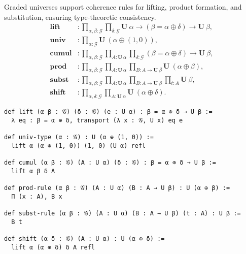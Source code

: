 \documentclass{article}
\begin{document}
\begin{definition}
Graded universes support coherence rules for lifting, product formation, and substitution,
ensuring type-theoretic consistency.
\[
\begin{aligned}
\mathbf{lift} & : \prod_{\alpha, \beta : \mathcal{G}} \prod_{\delta : \mathcal{G}}
\mathbf{U}\ \alpha \to (\beta = \alpha \oplus \delta) \to \mathbf{U}\ \beta, \\
\mathbf{univ} & : \prod_{\alpha : \mathcal{G}} \mathbf{U}\ (\alpha \oplus (1, 0)), \\
\mathbf{cumul} & : \prod_{\alpha, \beta : \mathcal{G}} \prod_{A : \mathbf{U}\ \alpha}
\prod_{\delta : \mathcal{G}} (\beta = \alpha \oplus \delta) \to \mathbf{U}\ \beta, \\
\mathbf{prod} & : \prod_{\alpha, \beta : \mathcal{G}} \prod_{A : \mathbf{U}\ \alpha}
\prod_{B : A \to \mathbf{U}\ \beta} \mathbf{U}\ (\alpha \oplus \beta), \\
\mathbf{subst} & : \prod_{\alpha, \beta : \mathcal{G}} \prod_{A : \mathbf{U}\ \alpha}
\prod_{B : A \to \mathbf{U}\ \beta} \prod_{t : A} \mathbf{U}\ \beta, \\
\mathbf{shift} & : \prod_{\alpha, \delta : \mathcal{G}} \prod_{A : \mathbf{U}\ \alpha}
\mathbf{U}\ (\alpha \oplus \delta).
\end{aligned}
\]
\begin{lstlisting}[mathescape=true]
def lift (α β : 𝒢) (δ : 𝒢) (e : U α) : β = α ⊕ δ → U β :=
  λ eq : β = α ⊕ δ, transport (λ x : 𝒢, U x) eq e

def univ-type (α : 𝒢) : U (α ⊕ (1, 0)) :=
  lift α (α ⊕ (1, 0)) (1, 0) (U α) refl

def cumul (α β : 𝒢) (A : U α) (δ : 𝒢) : β = α ⊕ δ → U β :=
  lift α β δ A

def prod-rule (α β : 𝒢) (A : U α) (B : A → U β) : U (α ⊕ β) :=
  Π (x : A), B x

def subst-rule (α β : 𝒢) (A : U α) (B : A → U β) (t : A) : U β :=
  B t

def shift (α δ : 𝒢) (A : U α) : U (α ⊕ δ) :=
  lift α (α ⊕ δ) δ A refl
\end{lstlisting}
\end{definition}
\end{document}
